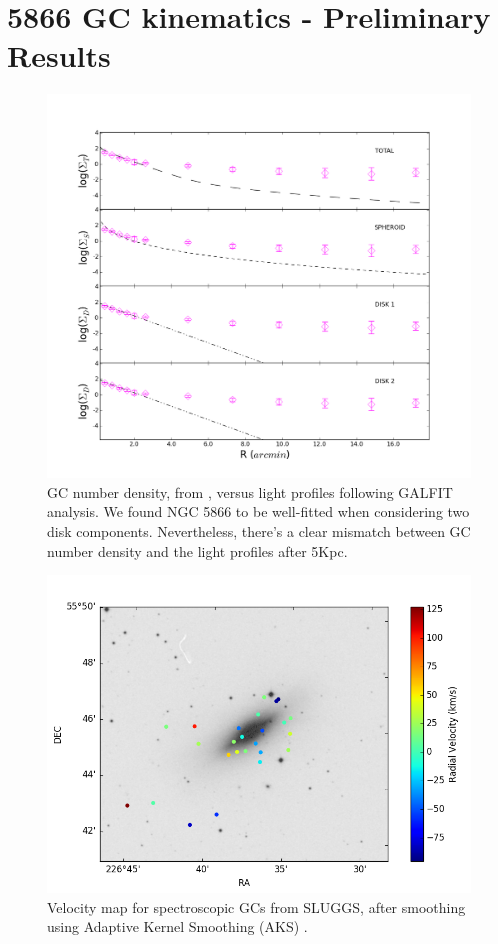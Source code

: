\documentclass[10pt,a4paper]{report}
\begin{document}
\section*{5866 GC kinematics - Preliminary Results}

\begin{figure}[h]
	\centering
	\includegraphics[scale=0.3]{5866dens3.png}
	\caption{GC number density, from \citet{hargis}, versus light profiles following GALFIT analysis. We found NGC 5866 to be well-fitted when considering two disk components. Nevertheless, there's a clear mismatch between GC number density and the light profiles after 5Kpc.}
\end{figure}

\begin{figure}[h]
	\centering
	\includegraphics[scale=0.5]{5866vmap.png}
	\caption{Velocity map for spectroscopic GCs from SLUGGS, after smoothing using Adaptive Kernel Smoothing (AKS) \citep{cocatto}.}
\end{figure}


\end{document}
